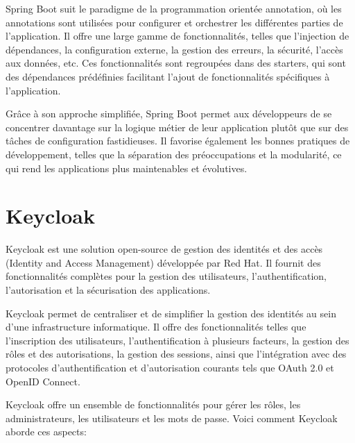 Spring Boot suit le paradigme de la programmation orientée annotation, où les annotations sont utilisées pour configurer et orchestrer les différentes parties de l'application. Il offre une large gamme de fonctionnalités, telles que l'injection de dépendances, la configuration externe, la gestion des erreurs, la sécurité, l'accès aux données, etc. Ces fonctionnalités sont regroupées dans des starters, qui sont des dépendances prédéfinies facilitant l'ajout de fonctionnalités spécifiques à l'application.

Grâce à son approche simplifiée, Spring Boot permet aux développeurs de se concentrer davantage sur la logique métier de leur application plutôt que sur des tâches de configuration fastidieuses. Il favorise également les bonnes pratiques de développement, telles que la séparation des préoccupations et la modularité, ce qui rend les applications plus maintenables et évolutives.

\cite{springboot}


\section{Keycloak}

Keycloak est une solution open-source de gestion des identités et des accès (Identity and Access Management) développée par Red Hat. Il fournit des fonctionnalités complètes pour la gestion des utilisateurs, l'authentification, l'autorisation et la sécurisation des applications.

Keycloak permet de centraliser et de simplifier la gestion des identités au sein d'une infrastructure informatique. Il offre des fonctionnalités telles que l'inscription des utilisateurs, l'authentification à plusieurs facteurs, la gestion des rôles et des autorisations, la gestion des sessions, ainsi que l'intégration avec des protocoles d'authentification et d'autorisation courants tels que OAuth 2.0 et OpenID Connect.

Keycloak offre un ensemble de fonctionnalités pour gérer les rôles, les administrateurs, les utilisateurs et les mots de passe. Voici comment Keycloak aborde ces aspects:

\cite{keycloak}

